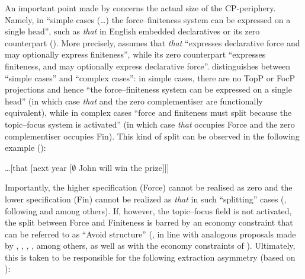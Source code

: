 An important point made by \citet[312--315]{rizzi1997} concerns the actual size of the CP-periphery. Namely, in ``simple cases (\ldots) the force--finiteness system can be expressed on a single head'', such as \textit{that} in English embedded declaratives or its zero counterpart (\citealt[312]{rizzi1997}). More precisely, \citet[312]{rizzi1997} assumes that \textit{that} ``expresses declarative force and may optionally express finiteness'', while its zero counterpart ``expresses finiteness, and may optionally express declarative force''. \citet[312]{rizzi1997} distinguishes between ``simple cases'' and ``complex cases'': in simple cases, there are no TopP or FocP projections and hence ``the force--finiteness system can be expressed on a single head'' (in which case \textit{that} and the zero complementiser are functionally equivalent), while in complex cases ``force and finiteness must split because the topic--focus system is activated'' (in which case \textit{that} occupies Force and the zero complementiser occupies Fin). This kind of split can be observed in the following example (\citealt[313, ex. 91]{rizzi1997}):

\ea \ldots [that [next year [$\emptyset$ John will win the prize]]]
\z

Importantly, the higher specification (Force) cannot be realised as zero and the lower specification (Fin) cannot be realized as \textit{that} in such ``splitting'' cases (\citealt[313]{rizzi1997}, following \citealt{rochemont1989} and \citealt{grimshaw1997} among others). If, however, the topic--focus field is not activated, the split between Force and Finiteness is barred by an economy constraint that can be referred to as ``Avoid structure'' (\citealt[314]{rizzi1997}, in line with analogous proposals made by \citealt{crisma1992}, \citealt{safir1993}, \citealt{speas1994}, \citealt{grimshaw1997}, among others, as well as with the economy constraints of \citealt{chomsky1991, chomsky1993, chomsky1995}). Ultimately, this is taken to be responsible for the following extraction asymmetry (based on \citealt[312 and 314, ex. 88 and 97]{rizzi1997}):

\ea
{}
\z
\z

